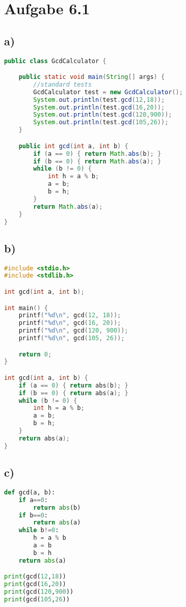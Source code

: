 \documentclass[a4paper,11pt]{scrartcl}
\begin{document}
		
	\section*{Aufgabe 6.1} 
	\subsection*{a)}
	    	\begin{lstlisting}[language=Java]
public class GcdCalculator {

    public static void main(String[] args) {
        //standard tests
        GcdCalculator test = new GcdCalculator();
        System.out.println(test.gcd(12,18));
        System.out.println(test.gcd(16,20));
        System.out.println(test.gcd(120,900));
        System.out.println(test.gcd(105,26));
    }

    public int gcd(int a, int b) {
        if (a == 0) { return Math.abs(b); }
        if (b == 0) { return Math.abs(a); }
        while (b != 0) {
            int h = a % b;
            a = b;
            b = h;
        }
        return Math.abs(a);
    }
}
            \end{lstlisting}
	
	\subsection*{b)}
        \begin{lstlisting}[language=C]
#include <stdio.h>
#include <stdlib.h>

int gcd(int a, int b);

int main() {
    printf("%d\n", gcd(12, 18));
    printf("%d\n", gcd(16, 20));
    printf("%d\n", gcd(120, 900));
    printf("%d\n", gcd(105, 26));

    return 0;
}

int gcd(int a, int b) {
    if (a == 0) { return abs(b); }
    if (b == 0) { return abs(a); }
    while (b != 0) {
        int h = a % b;
        a = b;
        b = h;
    }
    return abs(a);
}
        \end{lstlisting}
    
    \newpage
    \subsection*{c)}
        \begin{lstlisting}[language=Python]
def gcd(a, b):
    if a==0: 
        return abs(b)
    if b==0:
        return abs(a)
    while b!=0:
        h = a % b
        a = b
        b = h
    return abs(a)

print(gcd(12,18))
print(gcd(16,20))
print(gcd(120,900))
print(gcd(105,26))
        \end{lstlisting}
\end{document}
